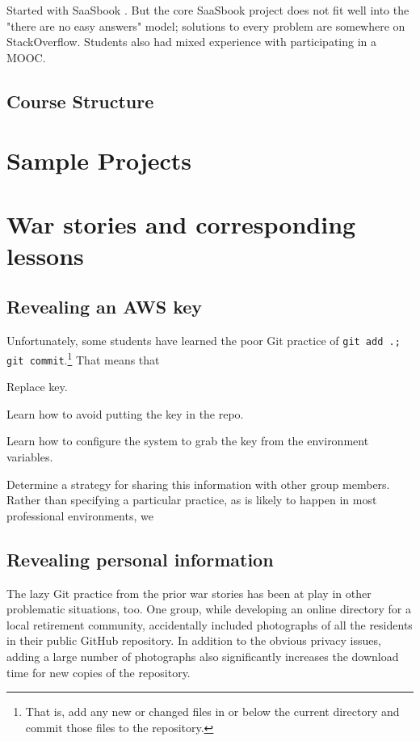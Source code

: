 Started with SaaSbook \cite{saasbook}.  But the core SaaSbook project
does not fit well into the "there are no easy answers" model;
solutions to every problem are somewhere on StackOverflow.  Students
also had mixed experience with participating in a MOOC.

\subsection{Course Structure}

\section{Sample Projects}

\section{War stories and corresponding lessons}

\subsection{Revealing an AWS key}

Unfortunately, some students have learned the poor Git practice of
\texttt{git add .; git commit}.\footnote{That is, add any new or
changed files in or below the current directory and commit those files
to the repository.}  That means that

Replace key.

Learn how to avoid putting the key in the repo.

Learn how to configure the system to grab the key from the environment
variables.

Determine a strategy for sharing this information with other group members.
Rather than specifying a particular practice, as is likely to happen in
most professional environments, we 

\subsection{Revealing personal information}

The lazy Git practice from the prior war stories has been at play
in other problematic situations, too.  One group, while developing
an online directory for a local retirement community, accidentally
included photographs of all the residents in their public GitHub
repository.  In addition to the obvious privacy issues, adding a
large number of photographs also significantly increases the download
time for new copies of the repository.

